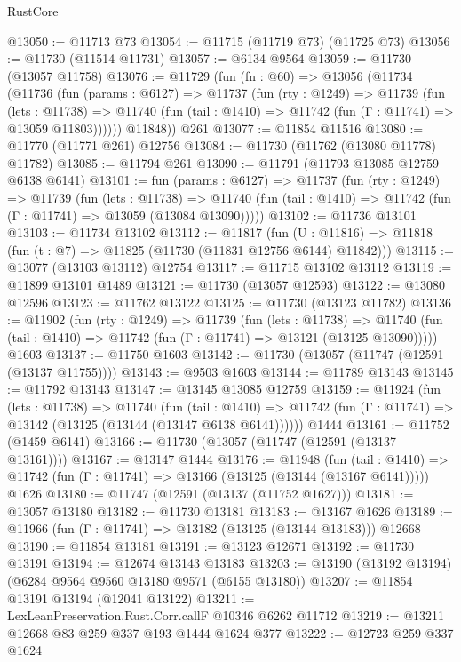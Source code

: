 \begin{lexlean}{RustCore}
\begin{coremodule}
@13050 := @11713 @73
@13054 := @11715 (@11719 @73) (@11725 @73)
@13056 := @11730 (@11514 @11731)
@13057 := @6134 @9564
@13059 := @11730 (@13057 @11758)
@13076 := @11729
    (fun (fn : @60) =>
    @13056
      (@11734
        (@11736
          (fun (params : @6127) =>
          @11737
            (fun (rty : @1249) =>
            @11739
              (fun (lets : @11738) =>
              @11740 (fun (tail : @1410) => @11742 (fun (Γ : @11741) => @13059 @11803))))))
        @11848))
    @261
@13077 := @11854 @11516
@13080 := @11770 (@11771 @261) @12756
@13084 := @11730 (@11762 (@13080 @11778) @11782)
@13085 := @11794 @261
@13090 := @11791 (@11793 @13085 @12759 @6138 @6141)
@13101 := fun (params : @6127) =>
  @11737
    (fun (rty : @1249) =>
    @11739
      (fun (lets : @11738) =>
      @11740 (fun (tail : @1410) => @11742 (fun (Γ : @11741) => @13059 (@13084 @13090)))))
@13102 := @11736 @13101
@13103 := @11734 @13102
@13112 := @11817
    (fun (U : @11816) => @11818 (fun (t : @7) => @11825 (@11730 (@11831 @12756 @6144) @11842)))
@13115 := @13077 (@13103 @13112) @12754
@13117 := @11715 @13102 @13112
@13119 := @11899 @13101 @1489
@13121 := @11730 (@13057 @12593)
@13122 := @13080 @12596
@13123 := @11762 @13122
@13125 := @11730 (@13123 @11782)
@13136 := @11902
    (fun (rty : @1249) =>
    @11739
      (fun (lets : @11738) =>
      @11740 (fun (tail : @1410) => @11742 (fun (Γ : @11741) => @13121 (@13125 @13090)))))
    @1603
@13137 := @11750 @1603
@13142 := @11730 (@13057 (@11747 (@12591 (@13137 @11755))))
@13143 := @9503 @1603
@13144 := @11789 @13143
@13145 := @11792 @13143
@13147 := @13145 @13085 @12759
@13159 := @11924
    (fun (lets : @11738) =>
    @11740
      (fun (tail : @1410) =>
      @11742 (fun (Γ : @11741) => @13142 (@13125 (@13144 (@13147 @6138 @6141))))))
    @1444
@13161 := @11752 (@1459 @6141)
@13166 := @11730 (@13057 (@11747 (@12591 (@13137 @13161))))
@13167 := @13147 @1444
@13176 := @11948
    (fun (tail : @1410) => @11742 (fun (Γ : @11741) => @13166 (@13125 (@13144 (@13167 @6141)))))
    @1626
@13180 := @11747 (@12591 (@13137 (@11752 @1627)))
@13181 := @13057 @13180
@13182 := @11730 @13181
@13183 := @13167 @1626
@13189 := @11966 (fun (Γ : @11741) => @13182 (@13125 (@13144 @13183))) @12668
@13190 := @11854 @13181
@13191 := @13123 @12671
@13192 := @11730 @13191
@13194 := @12674 @13143 @13183
@13203 := @13190 (@13192 @13194) (@6284 @9564 @9560 @13180 @9571 (@6155 @13180))
@13207 := @11854 @13191 @13194 (@12041 @13122)
@13211 := LexLeanPreservation.Rust.Corr.callF @10346 @6262 @11712
@13219 := @13211 @12668 @83 @259 @337 @193 @1444 @1624 @377
@13222 := @12723 @259 @337 @1624

\end{coremodule}
\end{lexlean}
